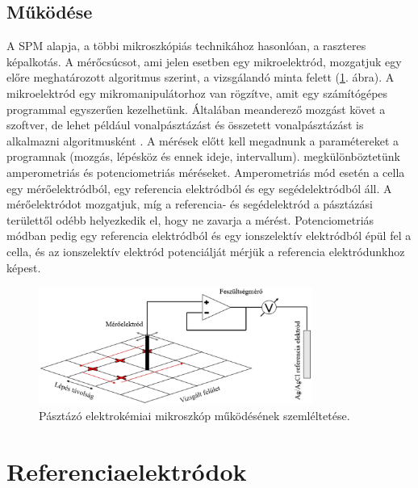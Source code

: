 \subsection{Működése}

A SPM alapja, a többi mikroszkópiás technikához hasonlóan, a raszteres képalkotás. A mérőcsúcsot, ami jelen esetben egy mikroelektród, mozgatjuk egy előre meghatározott algoritmus szerint, a vizsgálandó minta felett (\ref{fig:PEKM}. ábra). A mikroelektród egy mikromanipulátorhoz van rögzítve, amit egy számítógépes programmal egyszerűen kezelhetünk. Általában meanderező mozgást követ a szoftver, de lehet például vonalpásztázást és összetett vonalpásztázást is alkalmazni algoritmusként \cite{kiss2014new}. A mérések előtt kell megadnunk a paramétereket a programnak (mozgás, lépésköz és ennek ideje, intervallum).  megkülönböztetünk amperometriás és potenciometriás méréseket. Amperometriás mód esetén a cella egy mérőelektródból, egy referencia elektródból és egy segédelektródból áll. A mérőelektródot mozgatjuk, míg a referencia- és segédelektród a pásztázási területtől odébb helyezkedik el, hogy ne zavarja a mérést. Potenciometriás módban pedig egy referencia elektródból és egy ionszelektív elektródból épül fel a cella, és az ionszelektív elektród potenciálját mérjük a referencia elektródunkhoz képest.

\begin{figure}
\centering
\includegraphics[width=0.8\textwidth]{img/spm.eps}
\caption{Pásztázó elektrokémiai mikroszkóp működésének szemléltetése.}
\label{fig:PEKM}
\end{figure}

\section{Referenciaelektródok}

